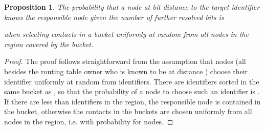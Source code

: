 \documentclass[10pt, conference, compsocconf, letterpaper]{IEEEtran}
\newtheorem{proposition}{Proposition}
\begin{document}
\vspace{3pt}
\begin{proposition}
\label{prop:s1}
The probability that a node  at bit distance  to the target identifier  knows the responsible
node given the number of further resolved bits  is
 
when selecting contacts in a bucket uniformly at random from all nodes in the region covered by
the bucket.
\end{proposition}
\begin{proof}
The proof follows straightforward from the assumption that  nodes (all besides the routing
table owner who is known to be at distance ) choose their identifier uniformly at random from
 identifiers. There are  identifiers sorted in the same bucket as , so that
the probability of a node to choose such an identifier is .
If there are less than  identifiers in the region, the responsible node is contained in the bucket,
otherwise the contacts in the buckets are chosen uniformly from all nodes in the region, i.e.
with probability  for  nodes. \end{proof}
\end{document}

